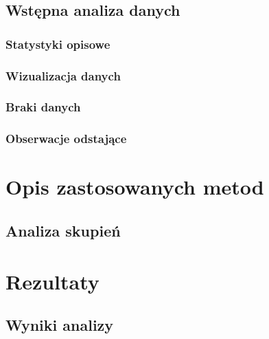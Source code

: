 \documentclass[a4paper,12pt]{article}
\begin{document}
\subsection{Wstępna analiza danych}

\subsubsection{Statystyki opisowe}

\subsubsection{Wizualizacja danych}

\subsubsection{Braki danych}

\subsubsection{Obserwacje odstające}

\section{Opis zastosowanych metod}

\subsection{Analiza skupień}

\section{Rezultaty}

\subsection{Wyniki analizy}
\end{document}
